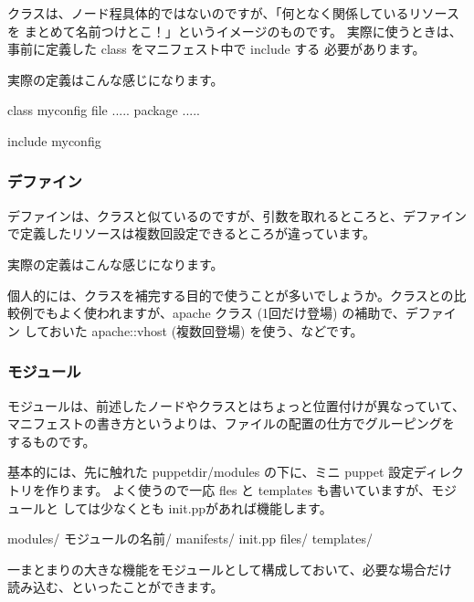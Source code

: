 \documentclass[mingoth,a4paper]{jsarticle}
\begin{document}
クラスは、ノード程具体的ではないのですが、「何となく関係しているリソースを
まとめて名前つけとこ！」というイメージのものです。
実際に使うときは、事前に定義した class をマニフェスト中で include する
必要があります。

実際の定義はこんな感じになります。

\begin{commandline}
class myconfig {
  file {.....}
  package {.....}
}

include myconfig
\end{commandline}

\subsubsection{デファイン}

デファインは、クラスと似ているのですが、引数を取れるところと、デファイン
で定義したリソースは複数回設定できるところが違っています。

実際の定義はこんな感じになります。


個人的には、クラスを補完する目的で使うことが多いでしょうか。クラスとの比
較例でもよく使われますが、apache クラス (1回だけ登場) の補助で、デファイン
しておいた apache::vhost (複数回登場) を使う、などです。


\subsubsection{モジュール}

モジュールは、前述したノードやクラスとはちょっと位置付けが異なっていて、
マニフェストの書き方というよりは、ファイルの配置の仕方でグルーピングを
するものです。

基本的には、先に触れた puppetdir/modules の下に、ミニ puppet
設定ディレクトリを作ります。
よく使うので一応 fles と templates も書いていますが、モジュールと
しては少なくとも init.ppがあれば機能します。

\begin{commandline}
modules/
 モジュールの名前/
   manifests/
     init.pp
   files/
   templates/
\end{commandline}

一まとまりの大きな機能をモジュールとして構成しておいて、必要な場合だけ
読み込む、といったことができます。
\end{document}
